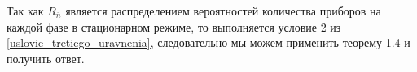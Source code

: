 Так как \(R_{\bar{n}}\) является распределением вероятностей 
количества приборов на каждой фазе в стационарном режиме, 
то выполняется условие 2 из \eqref{uslovie_tretiego_uravnenia},
следовательно мы можем применить теорему 1.4 и получить ответ.
